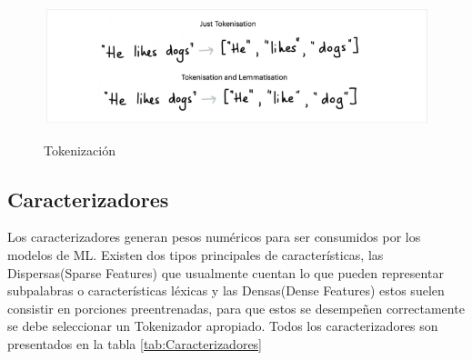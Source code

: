 \begin{figure}[h]
    \centering
    \includegraphics[width=\textwidth]{imagenes/cap3/tokenization.png}   
    \caption{Tokenización}
    \label{fig:tokenization-MLU}
    \cite{Rasa}
\end{figure}

\subsection{Caracterizadores}
 Los caracterizadores generan pesos numéricos para ser consumidos por los modelos de ML. Existen dos tipos principales de
 características, las Dispersas(Sparse Features) que usualmente cuentan lo que pueden representar subpalabras o características
 léxicas y las Densas(Dense Features) estos suelen consistir en porciones preentrenadas, para que
 estos se desempeñen correctamente se debe seleccionar un Tokenizador apropiado. \cite{warmerdam_2022}
 Todos los caracterizadores son presentados en la tabla \ref{tab:Caracterizadores}

